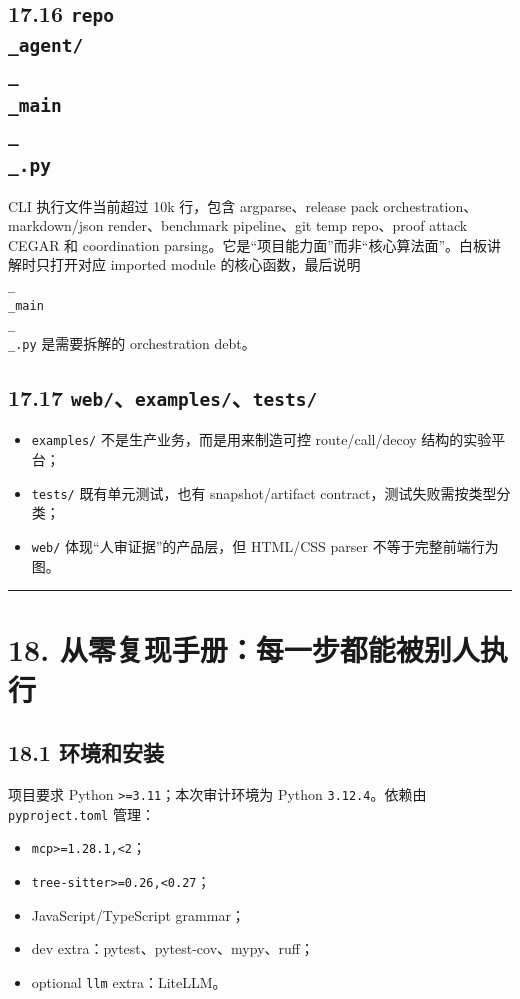 \documentclass[UTF8,12pt,openany]{ctexbook}
\begin{document}
\subsection{17.16 \texttt{repo\\_agent/\\_\\_main\\_\\_.py}}

CLI 执行文件当前超过 10k 行，包含 argparse、release pack orchestration、markdown/json render、benchmark pipeline、git temp repo、proof attack CEGAR 和 coordination parsing。它是“项目能力面”而非“核心算法面”。白板讲解时只打开对应 imported module 的核心函数，最后说明 \texttt{\\_\\_main\\_\\_.py} 是需要拆解的 orchestration debt。\par

\subsection{17.17 \texttt{web/}、\texttt{examples/}、\texttt{tests/}}

\begin{itemize}
\item \texttt{examples/} 不是生产业务，而是用来制造可控 route/call/decoy 结构的实验平台；
\item \texttt{tests/} 既有单元测试，也有 snapshot/artifact contract，测试失败需按类型分类；
\item \texttt{web/} 体现“人审证据”的产品层，但 HTML/CSS parser 不等于完整前端行为图。
\end{itemize}

\hrule

\section{18. 从零复现手册：每一步都能被别人执行}

\subsection{18.1 环境和安装}

项目要求 Python \texttt{>=3.11}；本次审计环境为 Python \texttt{3.12.4}。依赖由 \texttt{pyproject.toml} 管理：\par

\begin{itemize}
\item \texttt{mcp>=1.28.1,<2}；
\item \texttt{tree-sitter>=0.26,<0.27}；
\item JavaScript/TypeScript grammar；
\item dev extra：pytest、pytest-cov、mypy、ruff；
\item optional \texttt{llm} extra：LiteLLM。
\end{itemize}
\end{document}
